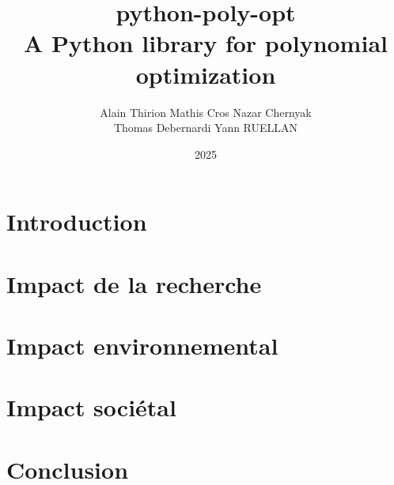 \documentclass[12pt,a4paper]{article}
\title{
  \textbf{python-poly-opt} \\
  \large{A Python library for polynomial optimization}
}
\author{
    Alain Thirion \quad
    Mathis Cros \quad
    Nazar Chernyak \\
    Thomas Debernardi \quad
    Yann RUELLAN
}
\date{2025}
\begin{document}
\maketitle


\section{Introduction}


\section{Impact de la recherche}

\section{Impact environnemental}

\section{Impact sociétal}

\section{Conclusion}
\end{document}
